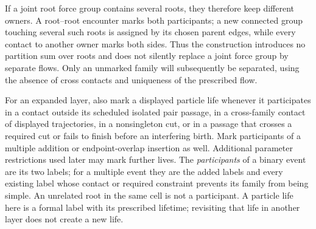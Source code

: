 If a joint root force group contains several roots, they therefore
keep different owners. A root--root encounter marks both participants;
a new connected group touching several such roots is assigned by its
chosen parent edges, while every contact to another owner marks both
sides. Thus the construction introduces no partition sum over roots
and does not silently replace a joint force group by separate flows.
Only an unmarked family will subsequently be separated, using the
absence of cross contacts and uniqueness of the prescribed flow.

For an expanded layer, also mark a displayed particle life whenever it
participates in a contact outside its scheduled isolated pair
passage, in a cross-family contact of displayed trajectories, in a
nonsingleton cut, or in a passage that crosses a required cut or fails
to finish before an interfering birth. Mark participants of a
multiple addition or endpoint-overlap insertion as well. Additional
parameter restrictions used later may mark further lives. The
\emph{participants} of a binary event are its two labels; for a
multiple event they are the added labels and every existing label
whose contact or required constraint prevents its family from being
simple. An unrelated root in the same cell is not a participant.
A particle life here is a formal label with its prescribed lifetime;
revisiting that life in another layer does not create a new life.

